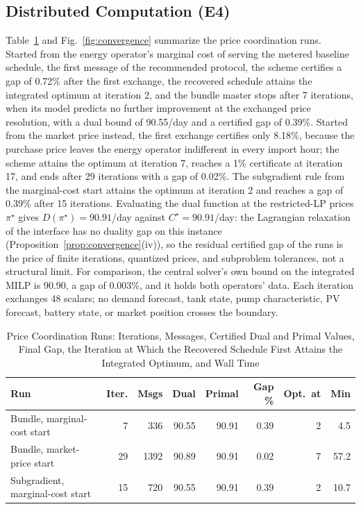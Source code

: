 \subsection{Distributed Computation (E4)}
Table~\ref{tab:coordination} and Fig.~\ref{fig:convergence} summarize the price coordination runs. Started from the
energy operator's marginal cost of serving the metered baseline schedule, the first message of the recommended protocol, the
scheme certifies a gap of 0.72\% after the first exchange, the recovered schedule attains the
integrated optimum at iteration 2, and the bundle master stops after 7 iterations, when its model
predicts no further improvement at the exchanged price resolution, with a dual bound of 90.55/day and a
certified gap of 0.39\%. Started from the market price instead, the first exchange certifies only
8.18\%, because the purchase price leaves the energy operator indifferent in every import hour;
the scheme attains the optimum at iteration 7, reaches a 1\% certificate at iteration 17,
and ends after 29 iterations with a gap of 0.02\%. The subgradient rule from the
marginal-cost start attains the optimum at iteration 2 and reaches a gap of 0.39\% after
15 iterations. Evaluating the dual function at the restricted-LP prices $\pi^\star$ gives $D(\pi^\star)=90.91$/day against $C^\star=90.91$/day: the Lagrangian relaxation of the interface has no duality gap on this instance (Proposition~\ref{prop:convergence}(iv)), so the residual certified gap of the runs is the price of finite iterations, quantized prices, and subproblem tolerances, not a structural limit. For comparison, the central solver's own bound on the integrated MILP is
90.90, a gap of 0.003\%, and it holds both operators' data. Each iteration exchanges 48 scalars; no demand forecast, tank state, pump
characteristic, PV forecast, battery state, or market position crosses the boundary.

\begin{table}[!t]
\caption{Price Coordination Runs: Iterations, Messages, Certified Dual and Primal Values, Final Gap, the Iteration at Which the Recovered Schedule First Attains the Integrated Optimum, and Wall Time}
\label{tab:coordination}
\centering
\scriptsize
\setlength{\tabcolsep}{2pt}
\begin{tabular}{@{}lrrrrrrr@{}}
\toprule
Run & Iter. & Msgs & Dual & Primal & Gap \% & Opt.\ at & Min \\
\midrule
Bundle, marginal-cost start & 7 & 336 & 90.55 & 90.91 & 0.39 & 2 & 4.5 \\
Bundle, market-price start & 29 & 1392 & 90.89 & 90.91 & 0.02 & 7 & 57.2 \\
Subgradient, marginal-cost start & 15 & 720 & 90.55 & 90.91 & 0.39 & 2 & 10.7 \\
\bottomrule
\end{tabular}
\end{table}

